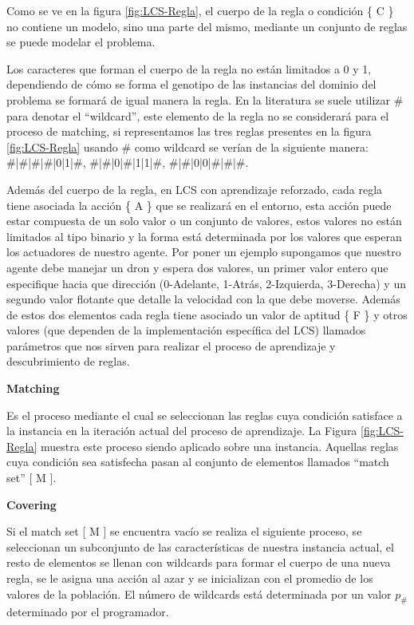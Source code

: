 \documentclass[11pt,fleqn]{book} %
\begin{document}
Como se ve en la figura  \ref{fig:LCS-Regla}, el cuerpo de la regla o condición \{ C \} no contiene un modelo, sino una parte del mismo, mediante un conjunto de reglas se puede modelar el problema.

Los caracteres que forman el cuerpo de la regla no están limitados a 0 y 1, dependiendo de cómo se forma el genotipo de las instancias del dominio del problema se formará de igual manera la regla. En la literatura se suele utilizar \# para denotar el “wildcard”, este elemento de la regla no se considerará para el proceso de matching, si representamos las tres reglas presentes en la figura \ref{fig:LCS-Regla} usando \# como wildcard se verían de la siguiente manera: \#|\#|\#|\#|0|1|\#, \#|\#|0|\#|1|1|\#,  \#|\#|0|0|\#|\#|\#.

Además del cuerpo de la regla, en LCS con aprendizaje reforzado, cada regla tiene asociada la acción \{ A \} que se realizará en el entorno, esta acción puede estar compuesta de un solo valor o un conjunto de valores, estos valores no están limitados al tipo binario y la forma está determinada por los valores que esperan los actuadores de nuestro agente. Por poner un ejemplo supongamos que nuestro agente debe manejar un dron y espera dos valores, un primer valor entero que especifique hacia que dirección (0-Adelante, 1-Atrás, 2-Izquierda, 3-Derecha) y un segundo valor flotante que detalle la velocidad con la que debe moverse.
Además de estos dos elementos cada regla tiene asociado un valor de aptitud \{ F \} y otros valores (que dependen de la implementación específica del LCS) llamados parámetros que nos sirven para realizar el proceso de aprendizaje y descubrimiento de reglas.

\textbf{Matching}

Es el proceso mediante el cual se seleccionan las reglas cuya condición satisface a la instancia en la iteración actual del proceso de aprendizaje. La Figura \ref{fig:LCS-Regla} muestra este proceso siendo aplicado sobre una instancia. Aquellas reglas cuya condición sea satisfecha pasan al conjunto de elementos llamados “match set” [ M ].

\textbf{Covering}

Si el match set [ M ] se encuentra vacío se realiza el siguiente proceso, se seleccionan un subconjunto de las características de nuestra instancia actual, el resto de elementos se llenan con wildcards para formar el cuerpo de una nueva regla, se le asigna una acción al azar y se inicializan con el promedio de los valores de la población. El número de wildcards está determinada por un valor $p_\#$ determinado por el programador.
\end{document}
